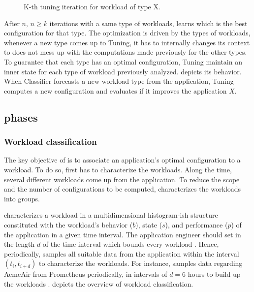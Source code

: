 \begin{figure*}[htp]
    \centering
    \def\svgwidth{\textwidth}
    \scalebox{1.0}{}
    \caption{K-th tuning iteration for workload of type X.}
    \label{fig:tuning-overview}
\end{figure*}

After $n,\, n \geq k$ iterations with a same type of workloads, \name learns
which is the best configuration for that type. The optimization is driven by the
types of workloads, whenever a new type comes up to Tuning, it has to internally
changes its context to does not mess up with the computations made previously
for the other types.  To guarantee that each type has an optimal configuration,
Tuning maintain an inner state for each type of workload previously analyzed.
 depicts its behavior. When Classifier forecasts a new
workload type from the application, Tuning computes a new configuration and
evaluates if it improves the application $X$.

\subsection{\name phases}


\subsubsection{Workload classification}

The key objective of \name is to associate an application's optimal
configuration to a workload. To do so, first \name has to characterize the
workloads. Along the time, several different workloads come up from the
application. To reduce the scope and the number of configurations to be
computed, \name characterizes the workloads into groups.

\name characterizes a workload in a multidimensional histogram-ish structure
constituted with the workload's behavior ($b$), state ($s$), and performance
($p$) of the application in a given time interval. The application engineer
should set in \name the length $d$ of the time interval which bounds every
workload . Hence, periodically, \name samples all suitable data from the
application within the interval $(t_i, t_{i+d})$ to characterize the workloads.
For instance, \name samples data regarding AcmeAir from Prometheus periodically,
in intervals of $d = 6$ hours to build up the workloads .
 depicts the overview of workload
classification.

